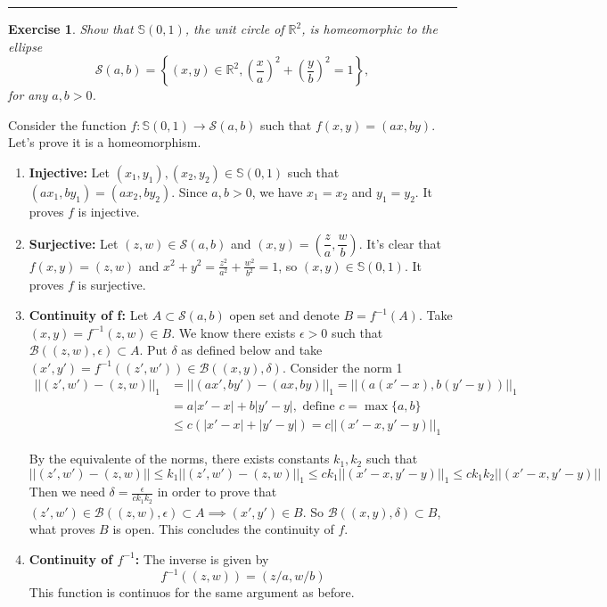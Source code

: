 \documentclass[a4paper,11pt]{article}
\newcommand{\linia}{\rule{\linewidth}{0.5pt}}
\theoremstyle{mytheor}
\theoremstyle{mytheor}
\newtheorem{exercise}{Exercise}
\theoremstyle{remark}
\newcommand{\B}{\mathcal{B}}
\newcommand{\R}{\mathbb{R}}
\begin{document}
\noindent\linia

\begin{exercise}
    Show that $\mathbb{S}(0, 1)$, the unit circle of $\R^2$, is homeomorphic
    to the ellipse 
    $$
    \mathcal{S}(a,b) = \left\{(x,y) \in \R^2,\left(\frac{x}{a}\right)^2 + \left(\frac{y}{b}\right)^2 = 1 \right\},
    $$
    for any $a, b > 0$. 
\end{exercise}

Consider the function $f : \mathbb{S}(0,1) \to \mathcal{S}(a,b)$ such that
$f(x,y) = (ax, by)$. Let's prove it is a homeomorphism. 

\begin{enumerate}
    \item \textbf{Injective:} Let $(x_1, y_1), (x_2, y_2) \in \mathbb{S}(0,1)$
    such that $(ax_1, by_1) = (ax_2, by_2)$. Since $a, b > 0$, we have $x_1 =
    x_2$ and $y_1 = y_2$. It proves $f$ is injective. 

    \item \textbf{Surjective:} Let $(z,w) \in \mathcal{S}(a,b)$ and $(x,y) =
    \left(\dfrac{z}{a}, \dfrac{w}{b}\right)$. It's clear that $f(x,y) = (z,w)$
    and $x^2 + y^2 = \frac{z^2}{a^2} + \frac{w^2}{b^2} = 1$, so $(x,y) \in
    \mathbb{S}(0,1)$. It proves $f$ is surjective. 
    
    \item \textbf{Continuity of f:} Let $A \subset \mathcal{S}(a,b)$ open set and denote
    $B = f^{-1}(A)$. Take $(x,y) = f^{-1}(z,w) \in B$. We know there exists
    $\epsilon > 0$ such that $\B((z,w), \epsilon) \subset A$. Put $\delta$ as
    defined below and 
    take $(x', y') = f^{-1}((z', w')) \in \B((x,y),\delta)$. Consider the norm
    1
    \begin{equation*}
        \begin{split}
            ||(z',w')-(z,w)||_1 &= ||(ax', by') - (ax, by)||_1 = ||\left(a(x' - x), b(y' - y)\right)||_1 \\ 
            &= a|x' - x| + b|y' - y|, \text{ define } c = \max\{a,b\}\\        
            &\le c(|x' - x| + |y' - y|) = c||(x' - x, y' - y)||_1
        \end{split}
    \end{equation*}

    By the equivalente of the norms, there exists constants $k_1, k_2$ such that 
    $$
    ||(z',w')-(z,w)|| \le k_1||(z',w')-(z,w)||_1 \le ck_1||(x' - x, y' - y)||_1 \le ck_1k_2||(x' - x, y' - y)|| 
    $$
    Then we need $\delta = \frac{\epsilon}{c k_1 k_2}$ in order to prove that
    $(z',w') \in \B((z,w), \epsilon) \subset A \implies (x',y') \in B$. So
    $\B((x,y),\delta) \subset B$, what proves $B$ is open. This concludes the
    continuity of $f$. 

    \item \textbf{Continuity of $f^{-1}$:} The inverse is given by 
    $$
    f^{-1}((z,w)) = (z/a, w/b)
    $$
    This function is continuos for the same argument as before. 
\end{enumerate}
\end{document}
